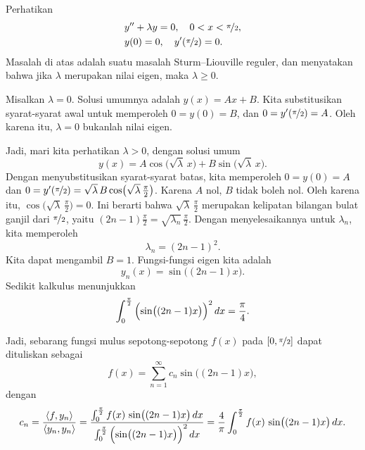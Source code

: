 \begin{example}
Perhatikan
\begin{align*}
& y'' + \lambda y = 0, \quad 0 < x < \nicefrac{\pi}{2} , \\
& y(0) =0, \quad y'(\nicefrac{\pi}{2}) = 0 .
\end{align*}
Masalah di atas adalah suatu masalah Sturm--Liouville reguler, dan
menyatakan bahwa jika $\lambda$ merupakan nilai eigen, maka
$\lambda \geq 0$.

Misalkan $\lambda = 0$.  Solusi umumnya adalah $y(x) = Ax + B$.
Kita substitusikan
syarat-syarat awal untuk memperoleh $0=y(0) = B$, dan $0 = y'(\nicefrac{\pi}{2}) = A$.
Oleh karena itu, $\lambda = 0$ bukanlah nilai eigen.

Jadi, mari kita perhatikan $\lambda > 0$, dengan
solusi umum
\begin{equation*}
y(x) = A \cos \bigl( \sqrt{\lambda} \, x \bigr)
+ B \sin \bigl( \sqrt{\lambda} \, x \bigr) .
\end{equation*}
Dengan menyubstitusikan syarat-syarat batas, kita memperoleh
$0 = y(0) = A$ dan $0 = y'(\nicefrac{\pi}{2})
= \sqrt{\lambda} \, B \cos \bigl(\sqrt{\lambda} \, \frac{\pi}{2}\bigr)$.
Karena $A$ nol,
$B$ tidak boleh nol.  Oleh karena itu, $\cos \bigl( \sqrt{\lambda} \,
\frac{\pi}{2}\bigr) = 0$.
Ini berarti bahwa
$\sqrt{\lambda} \,\frac{\pi}{2}$ merupakan kelipatan bilangan bulat ganjil dari
$\nicefrac{\pi}{2}$,
yaitu $(2n-1)\frac{\pi}{2} = \sqrt{\lambda_n} \,\frac{\pi}{2}$.
Dengan menyelesaikannya untuk $\lambda_n$, kita memperoleh
\begin{equation*}
\lambda_n = {(2n-1)}^2 .
\end{equation*}
Kita dapat mengambil $B = 1$.  Fungsi-fungsi eigen kita adalah
\begin{equation*}
y_n(x) = \sin \bigl( (2n-1)x \bigr) .
\end{equation*}
Sedikit kalkulus menunjukkan
\begin{equation*}
\int_0^{\frac{\pi}{2}} {\Bigl( \sin \bigl( (2n-1)x \bigr) \Bigr)}^2 \, dx
= \frac{\pi}{4} .
\end{equation*}

Jadi, sebarang fungsi mulus sepotong-sepotong $f(x)$ pada $[0,\nicefrac{\pi}{2}]$ dapat dituliskan sebagai
\begin{equation*}
f(x) = \sum_{n=1}^\infty c_n \sin \bigl( (2n-1)x \bigr) ,
\end{equation*}
dengan
\begin{equation*}
c_n = \frac{\langle f , y_n \rangle}{\langle y_n , y_n \rangle}
= \frac{\int_0^{\frac{\pi}{2}} f(x) \, \sin \bigl( (2n-1)x \bigr) \, dx
}{\int_0^{\frac{\pi}{2}} {\Bigl(\sin \bigl((2n-1)x\bigr)\Bigr)}^2 \, dx}
= \frac{4}{\pi} \int_0^{\frac{\pi}{2}} f(x) \,\sin \bigl( (2n-1)x \bigr) \, dx .
\end{equation*}


\end{example}
